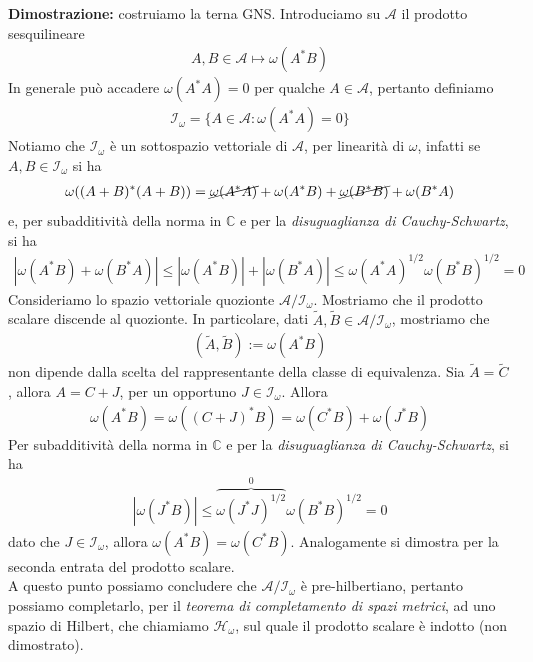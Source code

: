 \documentclass{article}
\numberwithin{equation}{subsection}
\begin{document}
\textbf{Dimostrazione:} costruiamo la terna GNS. Introduciamo su $\mathscr{A}$ il prodotto sesquilineare
\begin{align*}
    A, B \in \mathscr{A} \mapsto \omega(A^*B)
\end{align*}
In generale può accadere $\omega(A^*A) = 0$ per qualche $A \in \mathscr{A}$, pertanto definiamo
\begin{align*}
    \mathscr{I}_\omega = \{A \in \mathscr{A} : \omega(A^*A) = 0\}
\end{align*}
Notiamo che $\mathscr{I}_\omega$ è un sottospazio vettoriale di $\mathscr{A}$, per linearità di $\omega$, infatti se $A, B \in \mathscr{I}_\omega$ si ha
\begin{align*}
    \omega((A + B)^*(A + B)) = \cancel{\omega(A^*A)} + \omega(A^*B) + \cancel{\omega(B^*B)} + \omega(B^*A)
\end{align*}
e, per subadditività della norma in $\mathbb{C}$ e per la \textit{disuguaglianza di Cauchy-Schwartz}, si ha
\begin{align*}
    |\omega(A^*B) + \omega(B^*A)| \leq |\omega(A^*B)| + |\omega(B^*A)| \leq \omega(A^*A)^{1/2}\omega(B^*B)^{1/2} = 0
\end{align*}
Consideriamo lo spazio vettoriale quozionte $\mathscr{A}/\mathscr{I}_\omega$. Mostriamo che il prodotto scalare discende al quozionte. In particolare, dati $\widetilde{A}, \widetilde{B} \in \mathscr{A}/\mathscr{I}_\omega$, mostriamo che
\begin{align*}
    (\widetilde{A}, \widetilde{B}) := \omega(A^*B)
\end{align*}
non dipende dalla scelta del rappresentante della classe di equivalenza. Sia $\widetilde{A} = \widetilde{C}$, allora $A = C + J$, per un opportuno $J \in \mathscr{I}_\omega$. Allora
\begin{align*}
    \omega(A^*B) = \omega((C + J)^*B) = \omega(C^*B) + \omega(J^*B)
\end{align*}
Per subadditività della norma in $\mathbb{C}$ e per la \textit{disuguaglianza di Cauchy-Schwartz}, si ha
\begin{align*}
    |\omega(J^*B)| \leq \overbrace{\omega(J^*J)^{1/2}}^{0}\omega(B^*B)^{1/2} = 0
\end{align*}
dato che $J \in \mathscr{I}_\omega$, allora $\omega(A^*B) = \omega(C^*B)$. Analogamente si dimostra per la seconda entrata del prodotto scalare. \\
A questo punto possiamo concludere che $\mathscr{A}/\mathscr{I}_\omega$ è pre-hilbertiano, pertanto possiamo completarlo, per il \textit{teorema di completamento di spazi metrici}, ad uno spazio di Hilbert, che chiamiamo $\mathcal{H}_\omega$, sul quale il prodotto scalare è indotto (non dimostrato). \\
\end{document}
